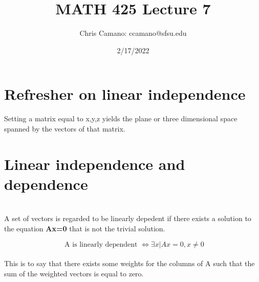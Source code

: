 \documentclass[12pt,a4paper]{article}
\author{Chris Camano: ccamano@sfsu.edu}
\title{MATH 425 Lecture 7 }
\date{2/17/2022}
\begin{document}
\maketitle

\section*{Refresher on linear independence}
Setting a matrix equal to x,y,z yields the plane or three dimensional space spanned by the vectors of that matrix.
\section*{Linear independence and dependence}\\
A set of vectors is regarded to be linearly depedent if there exists a solution to the equation \textbf{Ax=0} that is not the trivial solution.

\[
  \text{ A is linearly dependent }\iff \exists x | Ax=0, x\neq 0
\]
\\
This is to say that there exists some weights for the columns of A such that the sum of the weighted vectors is equal to zero.
\end{document}
